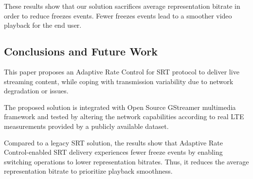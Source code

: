 These results show that our solution sacrifices average representation bitrate in order to reduce freezes events. Fewer freezes events lead to a smoother video playback for the end user.

\subsection{Conclusions and Future Work}
\label{sec:BMSB2020conlusion}
This paper proposes an Adaptive Rate Control for SRT protocol to deliver live streaming content, while coping with transmission variability due to network degradation or issues.

The proposed solution is integrated with Open Source GStreamer multimedia framework and tested by altering the network capabilities according to real LTE measurements provided by a publicly available dataset.

Compared to a legacy SRT solution, the results show that Adaptive Rate Control-enabled SRT delivery experiences fewer freeze events by enabling switching operations to lower representation bitrates. Thus, it reduces the average representation bitrate to prioritize playback smoothness.


